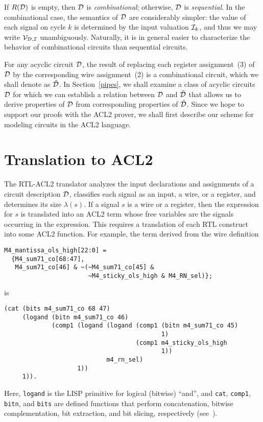\documentclass{article}
\begin{document}
If $R({\cal D})$ is empty, then ${\cal D}$ is {\it combinational};
otherwise, ${\cal D}$ is {\it sequential}.  In the combinational case,
the semantics of ${\cal D}$ are considerably simpler: the value of
each signal on cycle $k$ is determined by the input valuation ${\cal
I}_k$, and thus we may write ${\cal V}_{{\cal D},{\cal I}}$
unambiguously.  Naturally, it is in general easier to characterize the
behavior of combinational circuits than sequential circuits.

For any acyclic circuit ${\cal D}$, the result of replacing each
register assignment~(3) of ${\cal D}$ by the corresponding wire
assignment~(2) is a combinational circuit, which we shall denote as
$\tilde{\cal D}$.  In Section~\ref{pipes}, we shall examine a class of
acyclic circuits ${\cal D}$ for which we can establish a relation
between ${\cal D}$ and $\tilde{\cal D}$ that allows us to derive
properties of ${\cal D}$ from corresponding properties of $\tilde{\cal
D}$.  Since we hope to support our proofs with the ACL2 prover, we
shall first describe our scheme for modeling circuits in the ACL2
language.


\section{Translation to ACL2}\label{trans}

The RTL-ACL2 translator analyzes the input declarations and
assignments of a circuit description ${\cal D}$, classifies each
signal as an input, a wire, or a register, and determines its size
$\lambda(s)$.  If a signal $s$ is a wire or a register, then the
expression for $s$ is translated into an ACL2 term
whose free variables are the signals occurring in the
expression.  This requires a translation of each RTL construct into
some ACL2 function.  For example, the term derived from the wire
definition

\begin{verbatim}
M4_mantissa_ols_high[22:0] = 
  {M4_sum71_co[68:47], 
   M4_sum71_co[46] & ~(~M4_sum71_co[45] &
                       ~M4_sticky_ols_high & M4_RN_sel)};
\end{verbatim}
is
\begin{verbatim}
(cat (bits m4_sum71_co 68 47)
     (logand (bitn m4_sum71_co 46)
             (comp1 (logand (logand (comp1 (bitn m4_sum71_co 45) 
                                           1)
                                    (comp1 m4_sticky_ols_high
                                           1))
                            m4_rn_sel)
                    1))
     1)).
\end{verbatim}
Here, {\tt logand} is the LISP primitive for logical (bitwise) ``and'', and
{\tt cat}, {\tt comp1}, {\tt bitn}, and {\tt bits} are defined functions that
perform concatenation, bitwise complementation, bit extraction, and bit
slicing, respectively (see~\cite{mult}).
\end{document}
